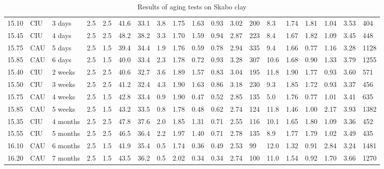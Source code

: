 \begin{sidewaystable*}[!p]
\begin{tabularx}{\textwidth}{lllXXllllllllllllll}
        15.10  & CIU   & 3 days & 2.5   & 2.5   & 41.6  & 33.1  & 3.8   & 1.75  & 1.63  & 0.93  & 3.02  & 200   & 8.3   & 1.74  & 1.81  & 1.04  & 3.53  & 404 \\     15.45  & CIU   & 4 days & 2.5   & 2.5   & 48.2  & 38.2  & 3.3   & 1.70  & 1.59  & 0.94  & 2.87  & 223   & 8.4   & 1.67  & 1.82  & 1.09  & 3.45  & 448 \\     15.75  & CAU   & 5 days & 2.5   & 1.5   & 39.4  & 34.4  & 1.9   & 1.76  & 0.59  & 0.78  & 2.94  & 335   & 9.4   & 1.66  & 0.77  & 1.16  & 3.28  & 1128 \\     15.85  & CAU   & 6 days & 2.5   & 1.5   & 40.0  & 33.4  & 2.3   & 1.78  & 0.72  & 0.93  & 3.28  & 307   & 10.6  & 1.68  & 0.90  & 1.33  & 3.79  & 1255 \\     15.40  & CIU   & 2 weeks & 2.5   & 2.5   & 40.6  & 32.7  & 3.6   & 1.89  & 1.57  & 0.83  & 3.04  & 195   & 11.8  & 1.90  & 1.77  & 0.93  & 3.60  & 571 \\     15.50  & CIU   & 3 weeks & 2.5   & 2.5   & 41.2  & 32.4  & 4.3   & 1.90  & 1.63  & 0.86  & 3.18  & 230   & 9.3   & 1.85  & 1.72  & 0.93  & 3.37  & 456 \\     15.75  & CAU   & 4 weeks & 2.5   & 1.5   & 42.8  & 33.4  & 0.9   & 1.90  & 0.47  & 0.52  & 2.85  & 135   & 5.0   & 1.76  & 0.77  & 1.01  & 3.41  & 635 \\     15.85  & CAU   & 5 weeks & 2.5   & 1.5   & 43.2  & 33.5  & 0.8   & 1.78  & 0.48  & 0.62  & 2.74  & 124   & 11.8  & 1.46  & 1.00  & 2.17  & 3.93  & 1382 \\     15.35  & CIU   & 4 months & 2.5   & 2.5   & 47.8  & 37.6  & 2.0   & 1.85  & 1.31  & 0.71  & 2.55  & 116   & 10.1  & 1.65  & 1.80  & 1.09  & 3.36  & 452 \\     15.55  & CIU   & 5 months & 2.5   & 2.5   & 46.5  & 36.4  & 2.2   & 1.97  & 1.40  & 0.71  & 2.78  & 135   & 8.9   & 1.77  & 1.79  & 1.02  & 3.49  & 435 \\     16.10  & CAU   & 6 months & 2.5   & 1.5   & 41.9  & 35.4  & 0.5   & 1.74  & 0.36  & 0.49  & 2.53  & 99    & 12.0  & 1.32  & 0.91  & 2.84  & 3.24  & 1481 \\     16.20  & CAU   & 7 months & 2.5   & 1.5   & 43.5  & 36.2  & 0.5   & 2.02  & 0.34  & 0.34  & 2.74  & 100   & 11.0  & 1.54  & 0.92  & 1.70  & 3.66  & 1270 \\ 
        \bottomrule
    \end{tabularx}%
    \label{table:2}%
    \vspace{10pt}
    \caption{Results of aging tests on Skabo clay}
    \addtocounter{table}{-1}

\end{sidewaystable*}
